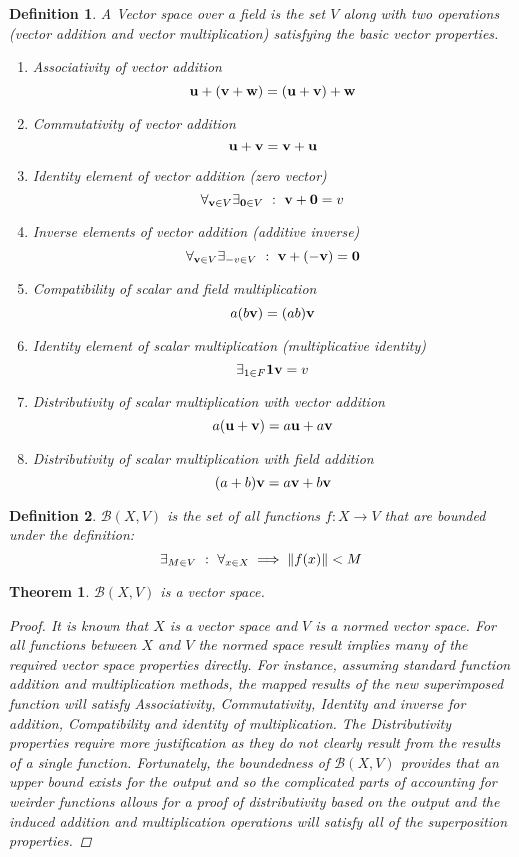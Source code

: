 \documentclass[]{article}
\newcommand{\st}{\ : \ }
\newtheorem{definition}{Definition}
\newtheorem{theorem}{Theorem}
\begin{document}
\begin{definition}\label{def:vec_space}
    A \emph{Vector space} over a field is the set $V$ along with two operations (vector addition and vector multiplication) satisfying the basic vector properties.
    \begin{enumerate}
        \item Associativity of vector addition
        \[\vb{u} + (\vb{v} + \vb{w}) = (\vb{u} + \vb{v}) + \vb{w}\]
        \item Commutativity of vector addition
        \[\vb{u} + \vb{v} = \vb{v} + \vb{u}\]
        \item Identity element of vector addition (zero vector)
        \[\forall_{\vb{v} \in V} \exists_{\vb{0} \in V} \st \vb{v} + \vb{0} = v \]
        \item Inverse elements of vector addition (additive inverse)
        \[\forall_{\vb{v} \in V} \exists_{-v \in V} \st \vb{v} + (-\vb{v}) = \vb{0}\]
        \item Compatibility of scalar and field multiplication
        \[a (b \vb{v}) = (a b) \vb{v}\]
        \item Identity element of scalar multiplication (multiplicative identity)
        \[\exists_{1 \in F} \vb{1} \vb{v} = v\]
        \item Distributivity of scalar multiplication with vector addition
        \[a (\vb{u} + \vb{v}) = a \vb{u} + a \vb{v}\]
        \item Distributivity of scalar multiplication with field addition
        \[(a + b) \vb{v} = a \vb{v} + b \vb{v}\]
    \end{enumerate}
\end{definition}

\begin{definition}
    $\mathcal{B}(X,V)$ is the set of all functions $f : X \to V$ that are bounded under the definition:
    \[\exists_{M \in V} \st \forall_{x\in X} \implies \norm{f(x)} < M\]
\end{definition}

\begin{theorem}
    $\mathcal{B}(X,V)$ is a vector space.
    \begin{proof}
        It is known that $X$ is a vector space and $V$ is a normed vector space.
        For all functions between $X$ and $V$ the normed space result implies many of the required vector space properties directly.
        For instance, assuming standard function addition and multiplication methods, the mapped results of the new superimposed function will satisfy Associativity, Commutativity, Identity and inverse for addition, Compatibility and identity of multiplication.
        The Distributivity properties require more justification as they do not clearly result from the results of a single function.
        Fortunately, the boundedness of $\mathcal{B}(X,V)$ provides that an upper bound exists for the output and so the complicated parts of accounting for weirder functions allows for a proof of distributivity based on the output and the induced addition and multiplication operations will satisfy all of the superposition properties.
    \end{proof}
\end{theorem}
\end{document}
